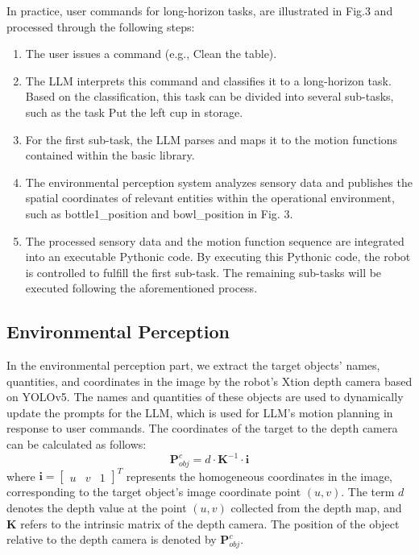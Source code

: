\documentclass[letterpaper,conference]{ieeeconf}
\begin{document}
In practice, user commands for long-horizon tasks, are illustrated in Fig.3 and processed through the following steps:
\begin{enumerate}
    \item The user issues a command (e.g., Clean the table).
    \item The LLM interprets this command and classifies it to a long-horizon task. Based on the classification, this task can be divided into several sub-tasks, such as the task Put the left cup in storage.
    \item For the first sub-task, the LLM parses and maps it to the motion functions contained within the basic library. 
    \item The environmental perception system analyzes sensory data and publishes the spatial coordinates of relevant entities within the operational environment, such as bottle1\_position and bowl\_position in Fig. 3.
    \item The processed sensory data and the motion function sequence are integrated into an executable Pythonic code. By executing this Pythonic code, the robot is controlled to fulfill the first sub-task. The remaining sub-tasks will be executed following the aforementioned process.
\end{enumerate}

\subsection{Environmental Perception}
In the environmental perception part, we extract the target objects' names, quantities, and coordinates in the image by the robot's Xtion depth camera based on YOLOv5. The names and quantities of these objects are used to dynamically update the prompts for the LLM, which is used for LLM's motion planning in response to user commands. The coordinates of the target to the depth camera can be calculated as follows: 
\begin{equation}
\boldsymbol{P}^{\textit{c}}_{\textit{obj}} = d \cdot \boldsymbol{K}^{-1} \cdot \boldsymbol{i}
\end{equation}
where \(\boldsymbol{i} = \begin{bmatrix} u & v & 1 \end{bmatrix}^T\) represents the homogeneous coordinates in the image, corresponding to the target object's image coordinate point \((u, v)\). The term \(d\) denotes the depth value at the point \((u, v)\) collected from the depth map, and \(\boldsymbol{K}\) refers to the intrinsic matrix of the depth camera. The position of the object relative to the depth camera is denoted by \(\boldsymbol{P}^{\textit{c}}_{\textit{obj}}\).
\end{document}
